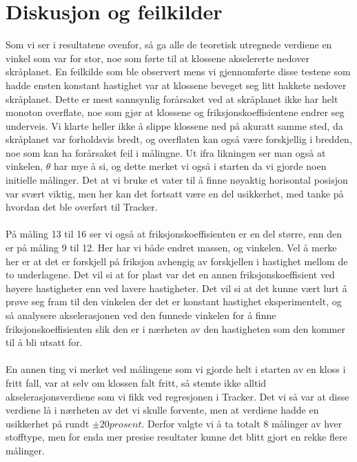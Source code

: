 \documentclass[10pt,a4paper]{report}
\begin{document}
\section*{Diskusjon og feilkilder}
Som vi ser i resultatene ovenfor, så ga alle de teoretisk utregnede verdiene en vinkel som var for stor, noe som førte til at klossene akselererte nedover skråplanet. En feilkilde som ble observert mens vi gjennomførte disse testene som hadde ensten konstant hastighet var at klossene beveget seg litt hakkete nedover skråplanet. Dette er mest sannsynlig forårsaket ved at skråplanet ikke har helt monoton overflate, noe som gjør at klossene og friksjonskoeffisientene endrer seg underveis. Vi klarte heller ikke å slippe klossene ned på akuratt samme sted, da skråplanet var forholdsvis bredt, og overflaten kan også være forskjellig i bredden, noe som kan ha forårsaket feil i målingne. Ut ifra likningen ser man også at vinkelen, $\theta$ har mye å si, og dette merket vi også i starten da vi gjorde noen initielle målinger. Det at vi bruke et vater til å finne nøyaktig horisontal posisjon var svært viktig, men her kan det fortsatt være en del usikkerhet, med tanke på hvordan det ble overført til Tracker. \\
\\På måling 13 til 16 ser vi også at friksjonskoeffisienten er en del større, enn den er på måling 9 til 12. Her har vi både endret massen, og vinkelen. Vel å merke her er at det er forskjell på friksjon avhengig av forskjellen i hastighet mellom de to underlagene. Det vil si at for plast var det en annen friksjonskoeffisient ved høyere hastigheter enn ved lavere hastigheter. Det vil si at det kunne vært lurt å prøve seg fram til den vinkelen der det er konstant hastighet eksperimentelt, og så analysere akselerasjonen ved den funnede vinkelen for å finne friksjonskoeffisienten slik den er i nærheten av den hastigheten som den kommer til å bli utsatt for.\\
\\En annen ting vi merket ved målingene som vi gjorde helt i starten av en kloss i fritt fall, var at selv om klossen falt fritt, så stemte ikke alltid akselerasjonsverdiene som vi fikk ved regresjonen i Tracker. Det vi så var at disse verdiene lå i nærheten av det vi skulle forvente, men at verdiene hadde en usikkerhet på rundt $\pm 20 prosent$. Derfor valgte vi å ta totalt 8 målinger av hver stofftype, men for enda mer presise resultater kunne det blitt gjort en rekke flere målinger.
\end{document}

